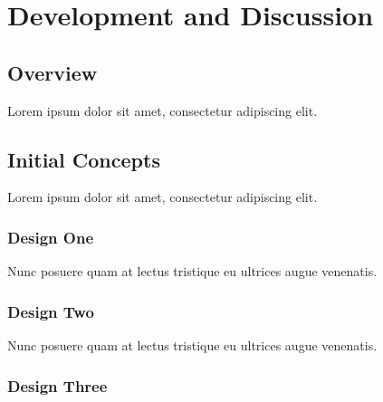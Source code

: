 
\chapter{Development and Discussion} %

\label{Chapter4} %


\section{Overview}

Lorem ipsum dolor sit amet, consectetur adipiscing elit.



\section{Initial Concepts}

Lorem ipsum dolor sit amet, consectetur adipiscing elit.

\subsection{Design One}

Nunc posuere quam at lectus tristique eu ultrices augue venenatis.

\subsection{Design Two}

Nunc posuere quam at lectus tristique eu ultrices augue venenatis.

\subsection{Design Three}

